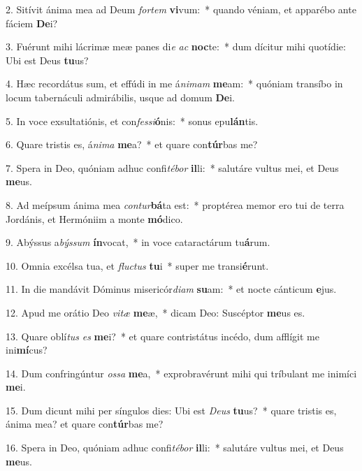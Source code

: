 2. Sitívit ánima mea ad Deum \textit{for}\textit{tem} \textbf{vi}vum:~*  quando véniam, et apparébo ante fáciem \textbf{De}i?\

3. Fuérunt mihi lácrimæ meæ panes di\textit{e} \textit{ac} \textbf{noc}te:~*  dum dícitur mihi quotídie: Ubi est Deus \textbf{tu}us?\

4. Hæc recordátus sum, et effúdi in me á\textit{ni}\textit{mam} \textbf{me}am:~*  quóniam transíbo in locum tabernáculi admirábilis, usque ad domum \textbf{De}i.\

5. In voce exsultatiónis, et con\textit{fes}\textit{si}\textbf{ó}nis:~*  sonus epu\textbf{lán}tis.\

6. Quare tristis es, á\textit{ni}\textit{ma} \textbf{me}a?~*  et quare con\textbf{túr}bas me?\

7. Spera in Deo, quóniam adhuc confi\textit{té}\textit{bor} \textbf{il}li:~*  salutáre vultus mei, et Deus \textbf{me}us.\

8. Ad meípsum ánima mea \textit{con}\textit{tur}\textbf{bá}ta est:~*  proptérea memor ero tui de terra Jordánis, et Hermóniim a monte \textbf{mó}dico.\

9. Abýssus a\textit{býs}\textit{sum} \textbf{ín}vocat,~*  in voce cataractárum tu\textbf{á}rum.\

10. Omnia excélsa tua, et \textit{fluc}\textit{tus} \textbf{tu}i~*  super me transi\textbf{é}runt.\

11. In die mandávit Dóminus misericór\textit{di}\textit{am} \textbf{su}am:~*  et nocte cánticum \textbf{e}jus.\

12. Apud me orátio Deo \textit{vi}\textit{tæ} \textbf{me}æ,~*  dicam Deo: Suscéptor \textbf{me}us es.\

13. Quare oblí\textit{tus} \textit{es} \textbf{me}i?~*  et quare contristátus incédo, dum afflígit me ini\textbf{mí}cus?\

14. Dum confringúntur \textit{os}\textit{sa} \textbf{me}a,~*  exprobravérunt mihi qui tríbulant me inimíci \textbf{me}i.\

15. Dum dicunt mihi per síngulos dies: Ubi est \textit{De}\textit{us} \textbf{tu}us?~*  quare tristis es, ánima mea? et quare con\textbf{túr}bas me?\

16. Spera in Deo, quóniam adhuc confi\textit{té}\textit{bor} \textbf{il}li:~*  salutáre vultus mei, et Deus \textbf{me}us.\

